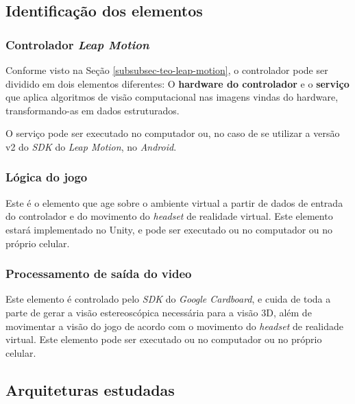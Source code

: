 \subsection{Identificação dos elementos}\label{subsec-identificacao-elementos}

\subsubsection{Controlador \textit{Leap Motion}}\label{subsubsec-elemento-leapmotion}

Conforme visto na Seção \ref{subsubsec-teo-leap-motion}, o controlador pode ser dividido em dois elementos diferentes: O \textbf{hardware do controlador} e o \textbf{serviço} que aplica algoritmos de visão computacional nas imagens vindas do hardware, transformando-as em dados estruturados.

O serviço pode ser executado no computador ou, no caso de se utilizar a versão v2 do \textit{SDK} do \textit{Leap Motion}, no \textit{Android}.

\subsubsection{Lógica do jogo}\label{subsubsec-elemento-logica-jogo}

Este é o elemento que age sobre o ambiente virtual a partir de dados de entrada do controlador e do movimento do \textit{headset} de realidade virtual. Este elemento estará implementado no Unity, e pode ser executado ou no computador ou no próprio celular.

\subsubsection{Processamento de saída do video}\label{subsubsec-elemento-video}

Este elemento é controlado pelo \textit{SDK} do \textit{Google Cardboard}, e cuida de toda a parte de gerar a visão estereoscópica necessária para a visão 3D, além de movimentar a visão do jogo de acordo com o movimento do \textit{headset} de realidade virtual. Este elemento pode ser executado ou no computador ou no próprio celular.

\subsection{Arquiteturas estudadas}\label{subsec-arquiteturas-estudadas}

